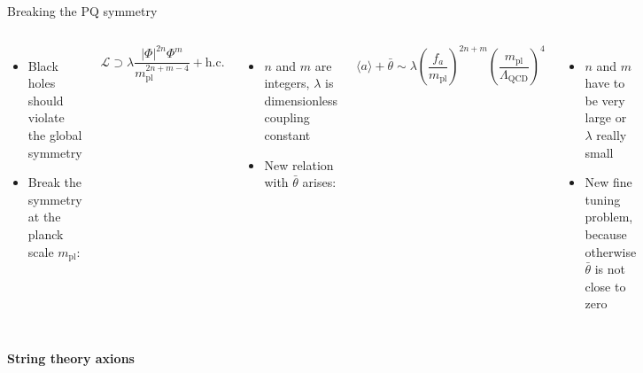 \documentclass[aspectratio=1610, 9pt]{beamer}
\begin{document}
\begin{frame}{Breaking the PQ symmetry}
  \begin{columns}
    \column{\textwidth}
    \begin{itemize}
      \item Black holes should violate the global symmetry
      \item Break the symmetry at the planck scale $m_{\mathrm{pl}}$:
    \end{itemize}
    \begin{equation*}
      \mathcal{L} \supset \lambda \frac{|\Phi|^{2n} \Phi^m}{m_{\mathrm{pl}}^{2n+m-4}} + \text{h.c.}
    \end{equation*}
    \begin{itemize}
      \item $n$ and $m$ are integers, $\lambda$ is dimensionless coupling constant
      \item New relation with $\bar{\theta}$ arises:
    \end{itemize}
    \begin{equation*}
      \langle a \rangle + \bar{\theta} \sim \lambda \left( \frac{f_a}{m_{\mathrm{pl}}} \right)^{2n+m} \left( \frac{m_{\mathrm{pl}}}{\Lambda_{\text{QCD}}} \right)^4
    \end{equation*}
    \begin{itemize}
      \item $n$ and $m$ have to be very large or $\lambda$ really small
      \item New fine tuning problem, because otherwise $\bar{\theta}$ is not close to zero
    \end{itemize}
  \end{columns} 
\end{frame}

\begin{frame}[noframenumbering]
  \centering
  \Huge \textbf{\textcolor{tugreen}{String theory axions}}
\end{frame}
\end{document}
